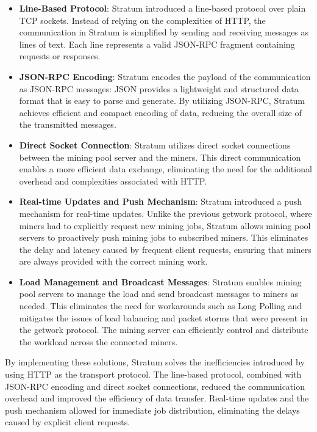 \begin{itemize}
    \item \textbf{Line-Based Protocol}: Stratum introduced a line-based protocol over plain TCP sockets. Instead of relying on the complexities of HTTP, the communication in Stratum is simplified by sending and receiving messages as lines of text. Each line represents a valid JSON-RPC fragment containing requests or responses.
    \item \textbf{JSON-RPC Encoding}: Stratum encodes the payload of the communication as JSON-RPC messages: JSON provides a lightweight and structured data format that is easy to parse and generate. By utilizing JSON-RPC, Stratum achieves efficient and compact encoding of data, reducing the overall size of the transmitted messages.
    \item \textbf{Direct Socket Connection}: Stratum utilizes direct socket connections between the mining pool server and the miners. This direct communication enables a more efficient data exchange, eliminating the need for the additional overhead and complexities associated with HTTP.
    \item \textbf{Real-time Updates and Push Mechanism}: Stratum introduced a push mechanism for real-time updates. Unlike the previous getwork protocol, where miners had to explicitly request new mining jobs, Stratum allows mining pool servers to proactively push mining jobs to subscribed miners. This eliminates the delay and latency caused by frequent client requests, ensuring that miners are always provided with the correct mining work.
    \item \textbf{Load Management and Broadcast Messages}: Stratum enables mining pool servers to manage the load and send broadcast messages to miners as needed. This eliminates the need for workarounds such as Long Polling and mitigates the issues of load balancing and packet storms that were present in the getwork protocol. The mining server can efficiently control and distribute the workload across the connected miners.
\end{itemize}
By implementing these solutions, Stratum solves the inefficiencies introduced by using HTTP as the transport protocol. The line-based protocol, combined with JSON-RPC encoding and direct socket connections, reduced the communication overhead and improved the efficiency of data transfer. Real-time updates and the push mechanism allowed for immediate job distribution, eliminating the delays caused by explicit client requests.\\\\
